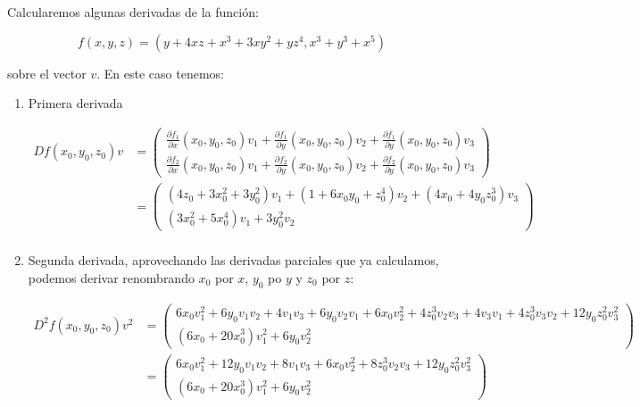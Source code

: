 \begin{exmp}
	Calcularemos algunas derivadas de la función:
	
	\begin{equation*}
		f(x,y,z) =(y + 4xz + x^3 + 3xy^2 + yz^4,x^3 + y^3 + x^5 )
	\end{equation*} 
	
	sobre el vector $v$. En este caso tenemos: 
	
	\begin{enumerate}
		\item Primera derivada
		
		\begin{align*}
			D f(x_0,y_0,z_0) v &= \begin{pmatrix}
				\frac{\partial f_1}{\partial x} (x_0,y_0,z_0)v_1  + \frac{\partial f_1}{\partial y} (x_0,y_0,z_0)v_2 +  \frac{\partial f_1}{\partial y} (x_0,y_0,z_0)v_3   \\
				\frac{\partial f_2}{\partial x} (x_0,y_0,z_0)v_1  + \frac{\partial f_2}{\partial y} (x_0,y_0,z_0)v_2 +  \frac{\partial f_2}{\partial y} (x_0,y_0,z_0)v_3    
			\end{pmatrix} \\
			&= \begin{pmatrix}
				(4z_0 +3x_0^2 + 3y_0^2)v_1  + (1+ 6x_0y_0 + z_0^4) v_2 +  (4x_0 + 4y_0z_0^3)v_3   \\
				(3x_0^2+ 5x_0^4) v_1  + 3y_0^2 v_2    
			\end{pmatrix} \\
		\end{align*}
		
		\item Segunda derivada, aprovechando las derivadas parciales que ya calculamos, podemos derivar renombrando $x_0$ por $x$, $y_0$ po $y$ y $z_0$ por $z$:
		
		\begin{align*}
			D^2f(x_0,y_0,z_0) v^2 &= \begin{pmatrix}
				6x_0 v_1^2  +  6y_0 v_1 v_2 + 4v_1v_3+ 6y_0 v_2 v_1 +  6x_0 v_2^2 + 4z_0^3 v_2v_3 + 4v_3 v_1 + 4z_0^3 v_3v_2 + 12y_0z_0^2 v_3^2 \\
				(6x_0+ 20x_0^3) v_1 ^2  + 6y_0 v_2^2    
			\end{pmatrix} \\
			&= \begin{pmatrix}
				6x_0 v_1^2  +  12 y_0 v_1 v_2 + 8v_1v_3 +  6x_0 v_2^2 + 8z_0^3 v_2v_3 + 12y_0z_0^2 v_3^2 \\
				(6x_0+ 20x_0^3) v_1 ^2  + 6y_0 v_2^2    
			\end{pmatrix} \\
		\end{align*}
		

\end{enumerate}
\end{exmp}
